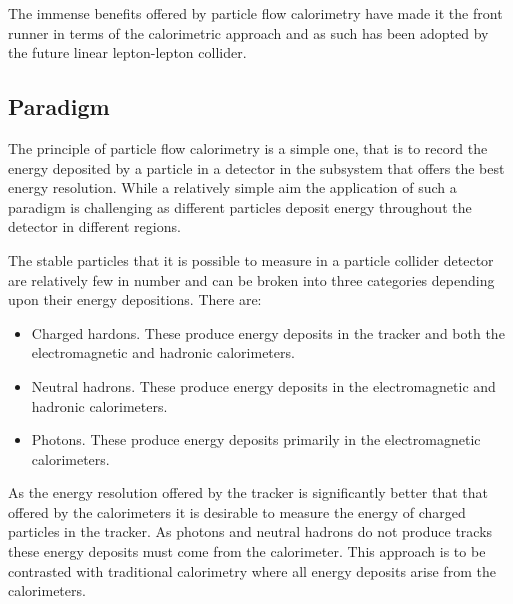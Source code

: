 The immense benefits offered by particle flow calorimetry have made it the front runner in terms of the calorimetric approach and as such has been adopted by the future linear lepton-lepton collider.  

\subsection{Paradigm}

The principle of particle flow calorimetry is a simple one, that is to record the energy deposited by a particle in a detector in the subsystem that offers the best energy resolution.  While a relatively simple aim the application of such a paradigm is challenging as different particles deposit energy throughout the detector in different regions.  

The stable particles that it is possible to measure in a particle collider detector are relatively few in number and can be broken into three categories depending upon their energy depositions.  There are:

\begin{itemize}
\item Charged hardons.  These produce energy deposits in the tracker and both the electromagnetic and hadronic calorimeters.
\item Neutral hadrons.  These produce energy deposits in the electromagnetic and hadronic calorimeters.
\item Photons.  These produce energy deposits primarily in the electromagnetic calorimeters. 
\end{itemize}

As the energy resolution offered by the tracker is significantly better that that offered by the calorimeters it is desirable to measure the energy of charged particles in the tracker.  As photons and neutral hadrons do not produce tracks these energy deposits must come from the calorimeter.  This approach is to be contrasted with traditional calorimetry where all energy deposits arise from the calorimeters.  
